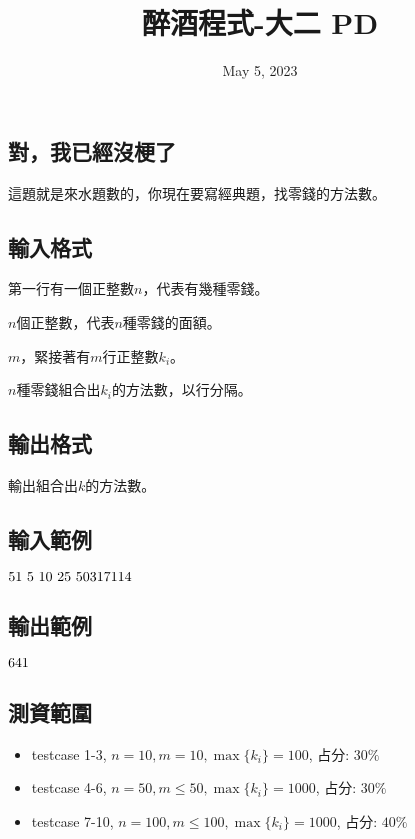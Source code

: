 \documentclass{article}
\title{醉酒程式-大二 PD}
\date{May 5, 2023}
\begin{document}
\begin{CJK*}{UTF8}{bsmi}

\maketitle

\section*{對，我已經沒梗了}

這題就是來水題數的，你現在要寫經典題，找零錢的方法數。

\subsection*{輸入格式}
第一行有一個正整數$n$，代表有幾種零錢。

$n$個正整數，代表$n$種零錢的面額。

$m$，緊接著有$m$行正整數$k_i$。

$n$種零錢組合出$k_i$的方法數，以行分隔。

\subsection*{輸出格式}
輸出組合出$k$的方法數。

\subsection*{輸入範例}
$5\\1\ 5\ 10\ 25\ 50\\3\\17\\11\\4$

\subsection*{輸出範例}
$6\\4\\1$

\subsection*{測資範圍}
\begin{itemize}
    \item testcase 1-3, $n=10,m=10,\max\{k_i\}=100$, 占分: $30\%$
    \item testcase 4-6, $n=50,m\leq50,\max\{k_i\}=1000$, 占分: $30\%$
    \item testcase 7-10, $n=100,m\leq100,\max\{k_i\}=1000$, 占分: $40\%$
\end{itemize}

\end{CJK*}
\end{document}
